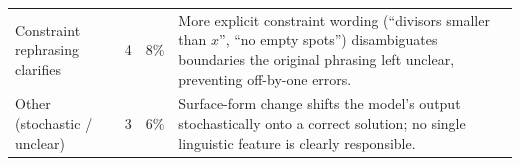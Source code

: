 \documentclass{article}
\begin{document}
\begin{table}[ht]
\begin{tabular}{p{4.0cm}p{1.0cm}p{1.0cm}p{8.4cm}}
\rowcolor[RGB]{255,235,200}
Constraint rephrasing clarifies &
4 & 8\% &
More explicit constraint wording (``divisors smaller than $x$'', ``no empty spots'') disambiguates boundaries the original phrasing left unclear, preventing off-by-one errors. \\
\addlinespace[3pt]

\rowcolor[RGB]{230,230,230}
Other (stochastic / unclear) &
3 & 6\% &
Surface-form change shifts the model's output stochastically onto a correct solution; no single linguistic feature is clearly responsible. \\

\bottomrule
\end{tabular}
\end{table}

\medskip

\end{document}
